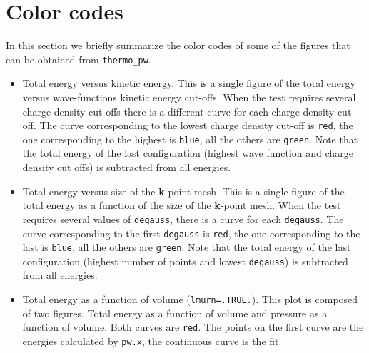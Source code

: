 \documentclass[12pt,a4paper]{article}
\begin{document}
\newpage
\section{\color{coral}Color codes}

In this section we briefly summarize the color codes of some of the figures
that can be obtained from \texttt{thermo\_pw}.

\begin{itemize} 
\item
Total energy versus kinetic energy. This is a single figure of the total
energy versus wave-functions kinetic energy cut-offs. When the test
requires several charge density cut-offs there is a different curve
for each charge density cut-off. The curve corresponding to the lowest
charge density cut-off is \texttt{red}, the one corresponding to the
highest is \texttt{blue}, all the others are \texttt{green}.
Note that the total energy of the last configuration (highest wave function
and charge density cut offs) is subtracted from all energies.

\item
Total energy versus size of the {\bf k}-point mesh. This is a single
figure of the total energy as a function of the size of the {\bf k}-point
mesh. When the test requires several values of \texttt{degauss}, there
is a curve for each \texttt{degauss}. The curve corresponding to the
first \texttt{degauss} is \texttt{red}, the one corresponding to the
last is \texttt{blue}, all the others are \texttt{green}.          
Note that the total energy of the last configuration (highest number of
points and lowest \texttt{degauss}) is subtracted from all energies.

\item
Total energy as a function of volume (\texttt{lmurn=.TRUE.}). 
This plot is composed of two figures. Total energy as a function of volume 
and pressure as a function of volume. Both curves are \texttt{red}.   
The points on the first curve are the energies calculated by 
\texttt{pw.x}, the continuous curve is the fit.


\end{itemize}
\end{document}
